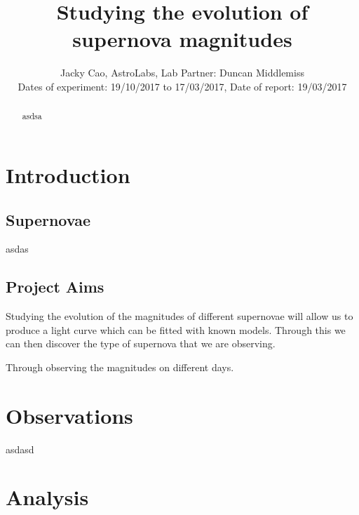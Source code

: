 \documentclass[twocolumn]{revtex4}
\begin{document}
\textheight=26.385cm

\title{Studying the evolution of supernova magnitudes}
 
\author{Jacky Cao, AstroLabs, Lab Partner: Duncan Middlemiss \\ Dates of experiment: 19/10/2017 to 17/03/2017, Date of report: 19/03/2017}

\begin{abstract}              
asdsa
\end{abstract}

\maketitle

\vspace{-3ex}
\section{Introduction} 
\vspace{-3ex}
\subsection{Supernovae}
\vspace{-2ex}

asdas

\vspace{-3ex}
\subsection{Project Aims}
\vspace{-2ex}

Studying the evolution of the magnitudes of different supernovae will allow us to produce a light curve which can be fitted with known models. Through this we can then discover the type of supernova that we are observing. 

Through observing the magnitudes on different days.

 

\vspace{-3ex}
\section{Observations} 
\vspace{-2ex}

asdasd

\vspace{-3ex}
\section{Analysis}
\vspace{-2ex}
\end{document}
